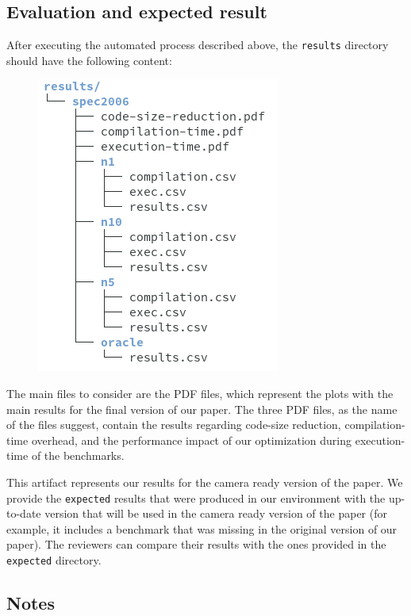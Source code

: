 {%
\subsection{Evaluation and expected result}

After executing the automated process described above, the \texttt{results} directory should have the following content:

\begin{figure}[h]
\includegraphics[scale=0.5]{figs/artifact/results.png}
\end{figure}

The main files to consider are the PDF files, which represent the plots with the
main results for the final version of our paper.
The three PDF files, as the name of the files suggest, contain the results regarding code-size reduction, compilation-time overhead,
and the performance impact of our optimization during execution-time of the benchmarks.

This artifact represents our results for the camera ready version of the paper.
We provide the \texttt{expected} results that were produced in our environment
with the up-to-date version that will be used in the camera ready version of the
paper (for example, it includes a benchmark that was missing in the original
version of our paper).
The reviewers can compare their results with the ones provided in the
\texttt{expected} directory.

\subsection{Notes}

}
